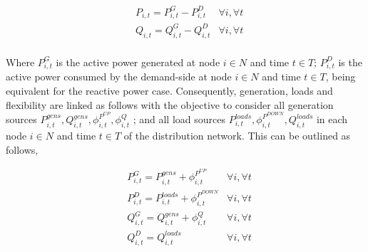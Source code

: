 \begin{subequations}
\begin{align*}
& P_{i,t} = P_{i,t}^{G} - P_{i,t}^{D}   & \forall i,\forall t \\
& Q_{i,t} = Q_{i,t}^{G} - Q_{i,t}^{D}   & \forall i,\forall t \\
\end{align*}
\end{subequations}

Where $P_{i,t}^{G}$ is the active power generated at node $i \in N$ and time $t \in T$; $P_{i,t}^{D}$ is the active power consumed by the demand-side at node $i \in N$ and time $t \in T$, being equivalent for the reactive power case. Consequently, generation, loads and flexibility are linked as follows with the objective to consider all generation sources $P_{i,t}^{gens}, Q_{i,t}^{gens}, \phi_{i,t}^{P^{UP}},\phi_{i,t}^{Q}$ ; and all load sources $P_{i,t}^{loads},\phi_{i,t}^{P^{DOWN}}, Q_{i,t}^{loads}$ in each node $i \in N$ and time $t \in T$ of the distribution network. This can be outlined as follows,

\begin{subequations}
\begin{align*}
& P_{i,t}^{G} = P_{i,t}^{gens} + \phi_{i,t}^{P^{UP}}    & \forall i,\forall t \\
& P_{i,t}^{D} = P_{i,t}^{loads} + \phi_{i,t}^{P^{DOWN}} & \forall i,\forall t \\
& Q_{i,t}^{G} = Q_{i,t}^{gens} + \phi_{i,t}^{Q}    & \forall i,\forall t\\
& Q_{i,t}^{D} = Q_{i,t}^{loads}  & \forall i,\forall t 
\end{align*}
\end{subequations}

